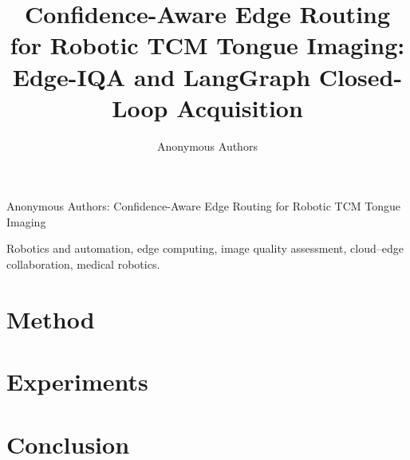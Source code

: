 \documentclass[lettersize,journal]{IEEEtran}
\begin{document}
\title{Confidence-Aware Edge Routing for Robotic TCM Tongue Imaging:\\
Edge-IQA and LangGraph Closed-Loop Acquisition}

\author{Anonymous Authors}

%
{Anonymous Authors: Confidence-Aware Edge Routing for Robotic TCM Tongue Imaging}



\begin{IEEEkeywords}
Robotics and automation, edge computing, image quality assessment, cloud--edge collaboration, medical robotics.
\end{IEEEkeywords}

\maketitle




\section{Method}
\label{sec:method}





\section{Experiments}
\label{sec:experiments}






\section{Conclusion}
\label{sec:conclusion}






\end{document}
